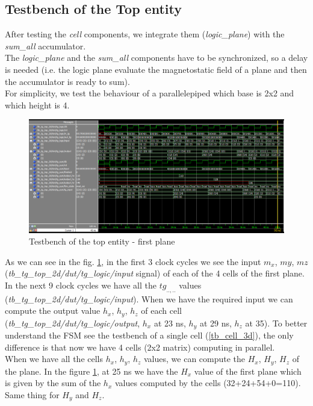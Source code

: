 \subsection{Testbench of the Top entity}
After testing the \textit{cell} components, we integrate them (\textit{logic\_plane}) with the \textit{sum\_all} accumulator.\\
The \textit{logic\_plane} and the \textit{sum\_all} components have to be synchronized, so a delay is needed (i.e. the logic plane evaluate the magnetostatic field of a plane and then the accumulator is ready to sum).\\
For simplicity, we test the behaviour of a parallelepiped which base is 2x2 and which height is 4.

\begin{figure}[h]
	\centering
	\includegraphics[width=\textwidth]{imm/3d/tb_3d_top.png}  
	\caption{Testbench of the top entity - first plane}
	\label{tb_3d_top}
\end{figure}
As we can see in the fig. \ref{tb_3d_top}, in the first 3 clock cycles we see the input   $m_x$, $ my$, $mz $ (\textit{tb\_tg\_top\_2d/dut/tg\_logic/input} signal) of each of the 4 cells of the first plane.\\
In the next 9 clock cycles we have all the $ tg_{..,..} $ values (\textit{tb\_tg\_top\_2d/dut/tg\_logic/input}). When we have the required input we can compute the output value $ h_x $, $ h_y $, $ h_z $ of each cell (\textit{tb\_tg\_top\_2d/dut/tg\_logic/output},  $ h_x $ at 23 ns, $ h_y $ at 29 ns, $ h_z $ at 35). To better understand the FSM see the testbench of a single cell (\ref{tb_cell_3d}), the only difference is that now we have 4 cells (2x2 matrix) computing in parallel.\\
When we have all the cells $ h_x $, $ h_y $, $ h_z $ values, we can compute the  $ H_x $, $ H_y $, $ H_z $ of the plane. In the figure \ref{tb_3d_top}, at 25 ns we have the $H_x$ value of the first plane which is given by the sum of the $h_x$ values computed by the cells (32+24+54+0=110). Same thing for $H_y$ and $H_z$.\\
